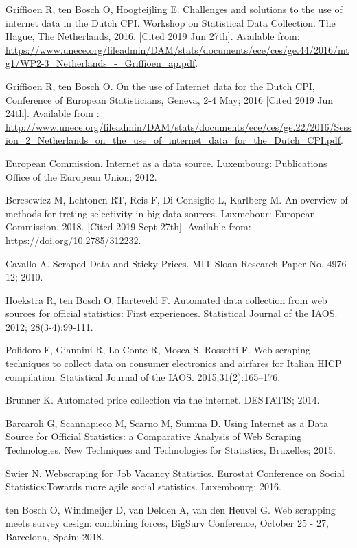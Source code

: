 \documentclass[]{article}
\begin{document}
\begin{thebibliography}{99}
Griffioen R, ten Bosch O, Hoogteijling E. Challenges and solutions to the use of internet data in the Dutch CPI. 
Workshop on Statistical Data Collection. The Hague, The Netherlands, 2016. [Cited 2019 Jun 27th]. Available from: \url{https://www.unece.org/fileadmin/DAM/stats/documents/ece/ces/ge.44/2016/mtg1/WP2-3_Netherlands_-_Griffioen_ap.pdf}.

Griffioen R, ten Bosch O. On the use of Internet data for the Dutch CPI,
Conference of European Statisticians, Geneva, 2-4 May; 2016 [Cited 2019 Jun 24th]. Available from : \url{http://www.unece.org/fileadmin/DAM/stats/documents/ece/ces/ge.22/2016/Session_2_Netherlands_on_the_use_of_internet_data_for_the_Dutch_CPI.pdf}.

European Commission. Internet as a data source. Luxembourg: Publications Office of the European Union; 2012.

Beresewicz M, Lehtonen RT, Reis F, Di Consiglio L, Karlberg M. An overview of methods for treting selectivity in big data sources. Luxmebour: European Commission, 2018. [Cited 2019 Sept 27th]. Available from: https://doi.org/10.2785/312232.


Cavallo A. Scraped Data and Sticky Prices. MIT Sloan Research Paper No. 4976-12; 2010.

Hoekstra R, ten Bosch O, Harteveld F. Automated data collection from web sources for official statistics: First experiences. 
Statistical Journal of the IAOS. 2012; 28(3-4):99-111.

Polidoro F, Giannini R, Lo Conte R, Mosca S, Rossetti F. Web scraping techniques to collect data on consumer electronics and airfares for Italian HICP compilation. Statistical Journal of the IAOS. 2015;31(2):165–176.

Brunner K. Automated price collection via the internet. DESTATIS; 2014.

Barcaroli G, Scannapieco M, Scarno M, Summa D. Using Internet as a Data Source for Official Statistics: a Comparative Analysis of Web Scraping Technologies.
New Techniques and Technologies for Statistics, Bruxelles; 2015.

Swier N. Webscraping for Job Vacancy Statistics. Eurostat Conference on Social Statistics:Towards more agile social statistics. Luxembourg; 2016.

ten Bosch O, Windmeijer D, van Delden A, van den Heuvel G. Web scrapping meets survey design: combining forces,
BigSurv Conference, October 25 - 27, Barcelona, Spain; 2018.


\end{thebibliography}
\end{document}
